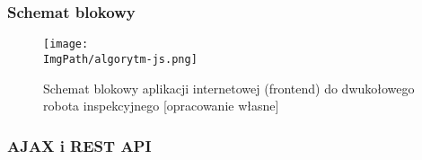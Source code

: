 \documentclass[a4paper,12pt,twoside,openany]{report}
\newcommand{\ImgPath}{.}
\begin{document}
\subsubsection{Schemat blokowy}

\begin{figure}[!htbp]
	\begin{center}
\centering
\texttt{[image: \\ImgPath/algorytm-js.png]}
\end{center}
	\caption{Schemat blokowy aplikacji internetowej (frontend) do dwukołowego robota inspekcyjnego [opracowanie własne]}
	\label{schematKomunikacji}
\end{figure}

\subsubsection{AJAX i REST API}
\end{document}
